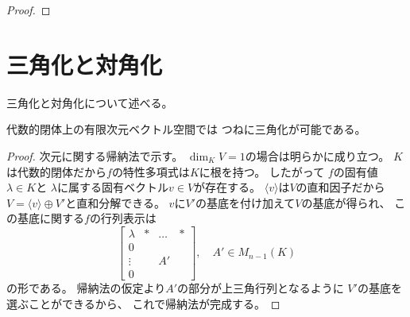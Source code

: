 \documentclass[report]{jlreq}
\begin{document}

\begin{proof}
\end{proof}

%
\section{三角化と対角化}

三角化と対角化について述べる。

\begin{definition}[三角化可能]
    \TODO{}
\end{definition}

代数的閉体上の有限次元ベクトル空間では
つねに三角化が可能である。


\begin{proof}
    次元に関する帰納法で示す。
    $\dim_K V = 1$の場合は明らかに成り立つ。
    $K$は代数的閉体だから$f$の特性多項式は$K$に根を持つ。
    したがって
    $f$の固有値$\lambda \in K$と
    $\lambda$に属する固有ベクトル$v \in V$が存在する。
    $\langle v \rangle$は$V$の直和因子だから
    $V = \langle v \rangle \oplus V'$と直和分解できる。
    $v$に$V'$の基底を付け加えて$V$の基底が得られ、
    この基底に関する$f$の行列表示は
    \begin{equation}
        \begin{bmatrix}
            \lambda & * & \dots & * \\
            0 \\
            \vdots & & A' \\
            0
        \end{bmatrix},
        \quad
        A' \in M_{n - 1}(K)
    \end{equation}
    の形である。
    帰納法の仮定より$A'$の部分が上三角行列となるように
    $V'$の基底を選ぶことができるから、
    これで帰納法が完成する。
\end{proof}
\end{document}
